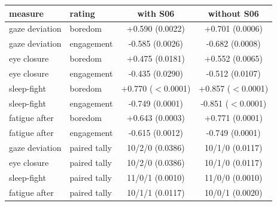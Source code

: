 \begin{tabular}{llcc}
\hline
measure & rating & with S06 & without S06 \\
\hline
gaze deviation & boredom & +0.590 (0.0022) & +0.701 (0.0006) \\
gaze deviation & engagement & -0.585 (0.0026) & -0.682 (0.0008) \\
eye closure & boredom & +0.475 (0.0181) & +0.552 (0.0065) \\
eye closure & engagement & -0.435 (0.0290) & -0.512 (0.0107) \\
sleep-fight & boredom & +0.770 ($<$0.0001) & +0.857 ($<$0.0001) \\
sleep-fight & engagement & -0.749 (0.0001) & -0.851 ($<$0.0001) \\
fatigue after & boredom & +0.643 (0.0003) & +0.771 (0.0001) \\
fatigue after & engagement & -0.615 (0.0012) & -0.749 (0.0001) \\
gaze deviation & paired tally & 10/2/0 (0.0386) & 10/1/0 (0.0117) \\
eye closure & paired tally & 10/2/0 (0.0386) & 10/1/0 (0.0117) \\
sleep-fight & paired tally & 11/0/1 (0.0010) & 11/0/0 (0.0010) \\
fatigue after & paired tally & 10/1/1 (0.0117) & 10/0/1 (0.0020) \\
\hline
\end{tabular}
